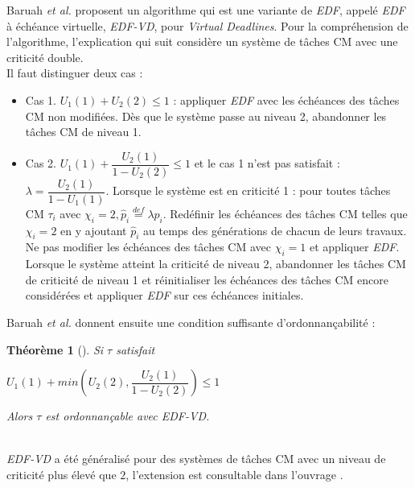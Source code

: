 \documentclass[12pt,a4paper,oneside]{book}
\theoremstyle{break}
\theoremstyle{breakplain}
\newtheorem{theo}{Théorème}[chapter]
\begin{document}
Baruah \textit{et al.} proposent un algorithme\cite{BaruahBDMSS11} qui est une variante de \textit{EDF}, appelé \textit{EDF} à échéance virtuelle, \textit{EDF-VD}, pour \textit{Virtual Deadlines}.
Pour la compréhension de l'algorithme, l'explication qui suit considère un système de tâches CM avec une criticité double.\\

Il faut distinguer deux cas :

\begin{itemize}
\item Cas 1. $U_1(1) + U_2(2) \le 1$ : appliquer \textit{EDF} avec les échéances des tâches CM non modifiées. Dès que le système passe au niveau 2, abandonner les tâches CM de niveau 1.
\item Cas 2. $U_1(1) + \dfrac{U_2(1)}{1-U_2(2)} \le 1$ et le cas 1 n'est pas satisfait : $\lambda = \dfrac{U_2(1)}{1-U_1(1)}$. Lorsque le système est en criticité 1 : pour toutes tâches CM $\tau_i$ avec $\chi_i = 2, \widehat{p}_i \overset{def}{=} \lambda p_i$. Redéfinir les échéances des tâches CM telles que $\chi_i = 2$ en y ajoutant $\widehat{p}_i$ au temps des générations de chacun de leurs travaux. Ne pas modifier les échéances des tâches CM avec $\chi _i =1$ et appliquer \textit{EDF}. Lorsque le système atteint la criticité de niveau 2, abandonner les tâches CM de criticité de niveau 1 et réinitialiser les échéances des tâches CM encore considérées et appliquer \textit{EDF} sur ces échéances initiales.
\end{itemize}

Baruah \textit{et al.} donnent ensuite une condition suffisante d'ordonnançabilité :\\

\begin{theo}[\cite{BaruahBDMSS11}]
Si $\tau$ satisfait
\begin{center}
$U_1(1) + min \left( U_2(2), \dfrac{U_2(1)}{1-U_2(2)} \right) \le 1$
\end{center}
Alors $\tau$ est ordonnançable avec \textit{EDF-VD}.\\
\end{theo}

\phantom\\

\textit{EDF-VD} a été généralisé pour des systèmes de tâches CM avec un niveau de criticité plus élevé que $2$, l'extension est consultable dans l'ouvrage \cite{BaruahBDMSS11}.
\end{document}
